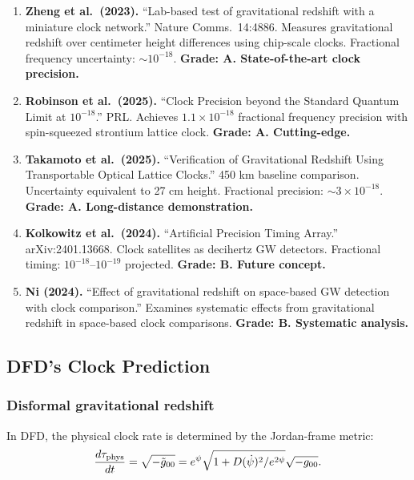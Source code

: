 \documentclass[11pt,a4paper]{article}
\begin{document}
\begin{enumerate}
\item \textbf{Zheng et al.\ (2023).} ``Lab-based test of gravitational redshift with a miniature clock network.'' Nature Comms.\ 14:4886. Measures gravitational redshift over centimeter height differences using chip-scale clocks. Fractional frequency uncertainty: $\sim 10^{-18}$. \textbf{Grade: A. State-of-the-art clock precision.}

\item \textbf{Robinson et al.\ (2025).} ``Clock Precision beyond the Standard Quantum Limit at $10^{-18}$.'' PRL. Achieves $1.1 \times 10^{-18}$ fractional frequency precision with spin-squeezed strontium lattice clock. \textbf{Grade: A. Cutting-edge.}

\item \textbf{Takamoto et al.\ (2025).} ``Verification of Gravitational Redshift Using Transportable Optical Lattice Clocks.'' 450 km baseline comparison. Uncertainty equivalent to 27 cm height. Fractional precision: $\sim 3 \times 10^{-18}$. \textbf{Grade: A. Long-distance demonstration.}

\item \textbf{Kolkowitz et al.\ (2024).} ``Artificial Precision Timing Array.'' arXiv:2401.13668. Clock satellites as decihertz GW detectors. Fractional timing: $10^{-18}$--$10^{-19}$ projected. \textbf{Grade: B. Future concept.}

\item \textbf{Ni (2024).} ``Effect of gravitational redshift on space-based GW detection with clock comparison.'' Examines systematic effects from gravitational redshift in space-based clock comparisons. \textbf{Grade: B. Systematic analysis.}
\end{enumerate}

\subsection{DFD's Clock Prediction}

\subsubsection{Disformal gravitational redshift}

In DFD, the physical clock rate is determined by the Jordan-frame metric:
\begin{equation}
\frac{d\tau_{\rm phys}}{dt} = \sqrt{-\tilde{g}_{00}} = e^{\psi}\sqrt{1 + D(\dot{\psi})^2/e^{2\psi}}\sqrt{-g_{00}}.
\end{equation}
\end{document}
